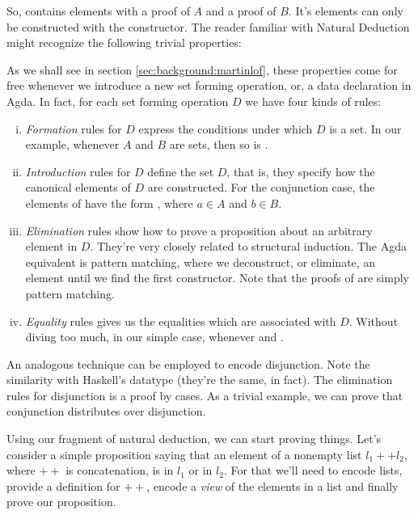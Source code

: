 
So,  contains elements with a proof of $A$ and a proof of $B$. It's elements
can only be constructed with the \inlagda{<\_,\_>} constructor. The reader familiar with Natural Deduction
might recognize the following trivial properties:


As we shall see in section \ref{sec:background:martinlof}, these properties come for free whenever we introduce 
a new set forming operation, or, a data declaration in Agda. In fact, for each set forming operation $D$
we have four kinds of rules:
\begin{enumerate}[i)]
  \item \emph{Formation} rules for $D$ express the conditions under which $D$ is a set.
        In our example, whenever $A$ and $B$ are sets, then so is .
  \item \emph{Introduction} rules for $D$ define the set $D$, that is, they specify how the
        canonical elements of $D$ are constructed. For the conjunction case, 
        the elements of  have the form , where $a \in A$
        and $b \in B$. 
  \item \emph{Elimination} rules show how to prove a proposition about an arbitrary element in $D$.
        They're very closely related to structural induction. The Agda equivalent is pattern matching,
        where we deconstruct, or eliminate, an element until we find the first constructor. Note that
        the proofs of  are simply pattern matching.
  \item \emph{Equality} rules gives us the equalities which are associated with $D$. Without diving
        too much, in our simple case,  whenever 
        and .
\end{enumerate}

An analogous technique can be employed to encode disjunction. Note the similarity with
Haskell's  datatype (they're the same, in fact). The elimination rules for
disjunction is a proof by cases. As a trivial example, we can prove that conjunction distributes
over disjunction.


Using our fragment of natural deduction, we can start proving things. Let's consider a simple
proposition saying that an element of a nonempty list $l_1 ++ l_2$, where $++$ is concatenation, is
in $l_1$ or in $l_2$. For that we'll need to encode lists, provide a definition for $++$,
encode a \emph{view} of the elements in a list and finally prove our proposition.

